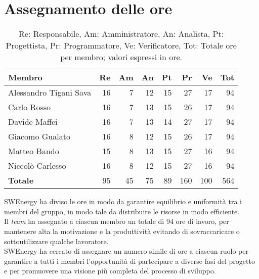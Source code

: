 \section{Assegnamento delle ore}

\begin{table}[H]
	\renewcommand{\arraystretch}{1.5}
	\centering
	\begin{tabular}{l|r|r|r|r|r|r|r}
		\textbf{Membro} & \textbf{Re} & \textbf{Am} & \textbf{An} & \textbf{Pt}
		& \textbf{Pr} & \textbf{Ve} & \textbf{Tot} \\
		\hline
		Alessandro Tigani Sava 	&	16 &  7 & 12 & 15 &  27 &  17 &  94 \\
		Carlo Rosso 			&	16 &  7 & 13 & 15 &  26 &  17 &  94 \\
		Davide Maffei			&	16 &  7 & 13 & 14 &  27 &  17 &  94 \\
		Giacomo Gualato 		&	16 &  8 & 12 & 15 &  26 &  17 &  94 \\
		Matteo Bando 			&	15 &  8 & 13 & 15 &  27 &  16 &  94	\\
		Niccolò Carlesso 		&	16 &  8 & 12 & 15 &  27 &  16 &  94 \\
		\hline
		\textbf{Totale} 		&	95 & 45 & 75 & 89 & 160 & 100 & 564 \\
	\end{tabular}

	\caption{Re: Responsabile, Am: Amministratore, An: Analista, Pt:
	Progettista, Pr: Programmatore, Ve: Verificatore, Tot: Totale ore per 
	membro; valori espressi in ore.}
\end{table}

SWEnergy ha diviso le ore in modo da garantire equilibrio e uniformità tra i
membri del gruppo, in modo tale da distribuire le risorse in modo efficiente. \\
Il \textit{team} ha assegnato a ciascun membro un totale di 94 ore di lavoro,
per mantenere alta la motivazione e la produttività evitando di sovraccaricare o
sottoutilizzare qualche lavoratore. \\
SWEnergy ha cercato di assegnare un numero simile di ore a ciascun ruolo per
garantire a tutti i membri l'opportunità di partecipare a diverse fasi del
progetto e per promuovere una visione più completa del processo di sviluppo.
